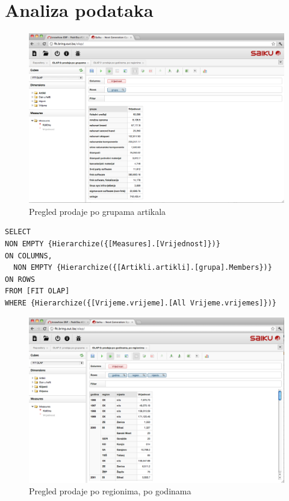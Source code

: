 \documentclass[times, utf8, seminar]{fit}
\begin{document}
\section{Analiza podataka}



\begin{figure}[H]
\centering
\includegraphics[width=15cm]{img/saiku_rpt_grupe}
\caption{Pregled prodaje po grupama artikala}
\end{figure}

\begin{lstlisting}
SELECT
NON EMPTY {Hierarchize({[Measures].[Vrijednost]})} 
ON COLUMNS,
  NON EMPTY {Hierarchize({[Artikli.artikli].[grupa].Members})} 
ON ROWS
FROM [FIT OLAP]
WHERE {Hierarchize({[Vrijeme.vrijeme].[All Vrijeme.vrijemes]})}
\end{lstlisting}


\begin{figure}[H]
\centering
\includegraphics[width=15cm]{img/saiku_rpt_region}
\caption{Pregled prodaje po regionima, po godinama}
\end{figure}
\end{document}
